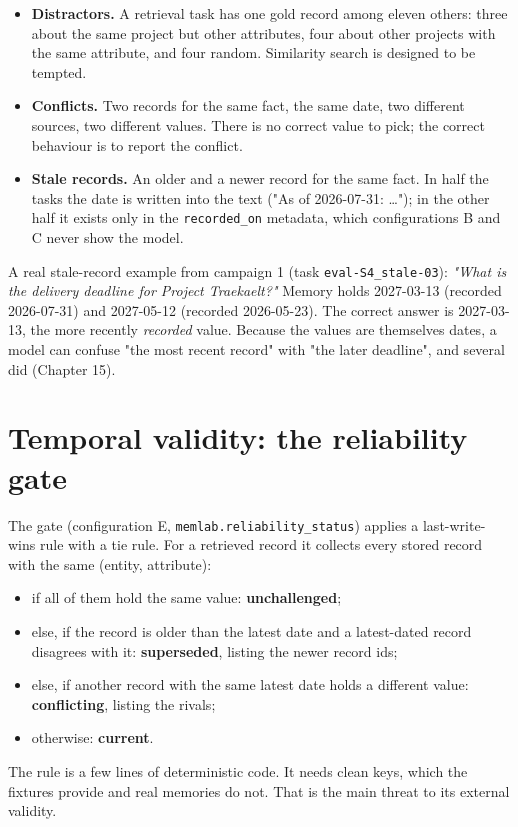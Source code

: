 \documentclass[10.5pt,a4paper,oneside]{report}
\begin{document}
\begin{itemize}
\item \textbf{Distractors.} A retrieval task has one gold record among eleven others: three about the same project but other attributes, four about other projects with the same attribute, and four random. Similarity search is designed to be tempted.
\item \textbf{Conflicts.} Two records for the same fact, the same date, two different sources, two different values. There is no correct value to pick; the correct behaviour is to report the conflict.
\item \textbf{Stale records.} An older and a newer record for the same fact. In half the tasks the date is written into the text ("As of 2026-07-31: …"); in the other half it exists only in the \texttt{recorded\_\allowbreak{}on} metadata, which configurations B and C never show the model.
\end{itemize}
A real stale-record example from campaign 1 (task \texttt{eval-S4\_\allowbreak{}stale-03}): \emph{"What is the delivery deadline for Project Traekaelt?"} Memory holds 2027-03-13 (recorded 2026-07-31) and 2027-05-12 (recorded 2026-05-23). The correct answer is 2027-03-13, the more recently \emph{recorded} value. Because the values are themselves dates, a model can confuse "the most recent record" with "the later deadline", and several did (Chapter 15).

\section{Temporal validity: the reliability gate}
The gate (configuration E, \texttt{memlab.\allowbreak{}reliability\_\allowbreak{}status}) applies a last-write-wins rule with a tie rule. For a retrieved record it collects every stored record with the same (entity, attribute):

\begin{itemize}
\item if all of them hold the same value: \textbf{unchallenged};
\item else, if the record is older than the latest date and a latest-dated record disagrees with it: \textbf{superseded}, listing the newer record ids;
\item else, if another record with the same latest date holds a different value: \textbf{conflicting}, listing the rivals;
\item otherwise: \textbf{current}.
\end{itemize}
The rule is a few lines of deterministic code. It needs clean keys, which the fixtures provide and real memories do not. That is the main threat to its external validity.
\end{document}
